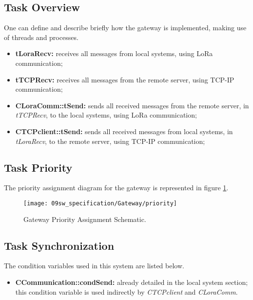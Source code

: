 \subsection{Task Overview}
One can define and describe briefly how the gateway is implemented, making use of threads and processes.

\begin{itemize}
	\item \textbf{tLoraRecv:} receives all messages from local systems, using LoRa communication;
	\item \textbf{tTCPRecv:} receives all messages from the remote server, using TCP-IP communication;	
	\item \textbf{CLoraComm::tSend:} sends all received messages from the remote server, in \textit{tTCPRecv}, to the local systems, using LoRa communication; 
	\item \textbf{CTCPclient::tSend:} sends all received messages from local systems, in \textit{tLoraRecv}, to the remote server, using TCP-IP communication;
\end{itemize}

\subsection{Task Priority}
The priority assignment diagram for the gateway is represented in figure \ref{fig:gwt_priority}.

\begin{figure}[H]
	\centering
	\texttt{[image: 09sw\_specification/Gateway/priority]}
	\caption{Gateway Priority Assignment Schematic.}
	\label{fig:gwt_priority}
\end{figure}

\subsection{Task Synchronization}


The condition variables used in this system are listed below.

\begin{itemize}
	\item \textbf{CCommunication::condSend:} already detailed in the local system section; this condition variable is used indirectly by \textit{CTCPclient} and \textit{CLoraComm}.
\end{itemize}

